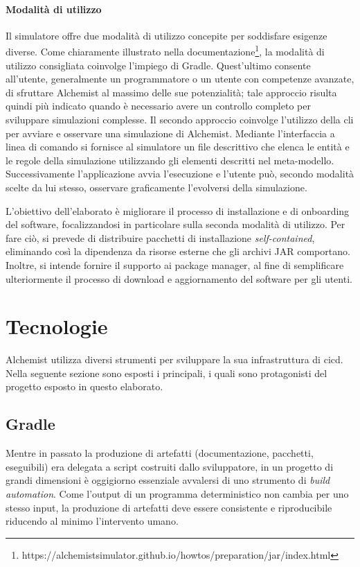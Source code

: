 \paragraph{Modalità di utilizzo} Il simulatore offre due modalità di utilizzo concepite per soddisfare esigenze diverse. 
Come chiaramente illustrato nella documentazione\footnote{https://alchemistsimulator.github.io/howtos/preparation/jar/index.html}, la modalità di utilizzo consigliata coinvolge l'impiego di Gradle. Quest'ultimo consente all'utente, generalmente un programmatore o un utente con competenze avanzate, di sfruttare Alchemist al massimo delle sue potenzialità; tale approccio risulta quindi più indicato quando è necessario avere un controllo completo per sviluppare simulazioni complesse. Il secondo approccio coinvolge l'utilizzo della \ac{cli} per avviare e osservare una simulazione di Alchemist. Mediante l'interfaccia a linea di comando si fornisce al simulatore un file descrittivo che elenca le entità e le regole della simulazione utilizzando gli elementi descritti nel meta-modello. Successivamente l'applicazione avvia l'esecuzione e l'utente può, secondo modalità scelte da lui stesso, osservare graficamente l'evolversi della simulazione.

L'obiettivo dell'elaborato è migliorare il processo di installazione e di onboarding del software, focalizzandosi in particolare sulla seconda modalità di utilizzo. Per fare ciò, si prevede di distribuire pacchetti di installazione \textit{self-contained}, eliminando così la dipendenza da risorse esterne che gli archivi JAR comportano. Inoltre, si intende fornire il supporto ai package manager, al fine di semplificare ulteriormente il processo di download e aggiornamento del software per gli utenti.

\section{Tecnologie}\label{sec:technologies}

Alchemist utilizza diversi strumenti per sviluppare la sua infrastruttura di \ac{cicd}. Nella seguente sezione sono esposti i principali, i quali sono protagonisti del progetto esposto in questo elaborato.

\subsection{Gradle}

Mentre in passato la produzione di artefatti (documentazione, pacchetti, eseguibili) era delegata a script costruiti dallo sviluppatore, in un progetto di grandi dimensioni è oggigiorno essenziale avvalersi di uno strumento di \textit{build automation}. Come l'output di un programma deterministico non cambia per uno stesso input, la produzione di artefatti deve essere consistente e riproducibile riducendo al minimo l'intervento umano. 


